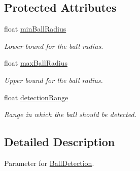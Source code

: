 \subsection*{\-Protected \-Attributes}
\begin{DoxyCompactItemize}
\item 
\hypertarget{classBallDetectionParameter_a258498986da34f843c173ad9bb2404da}{float \hyperlink{classBallDetectionParameter_a258498986da34f843c173ad9bb2404da}{min\-Ball\-Radius}}\label{classBallDetectionParameter_a258498986da34f843c173ad9bb2404da}

\begin{DoxyCompactList}\small\item\em \-Lower bound for the ball radius. \end{DoxyCompactList}\item 
\hypertarget{classBallDetectionParameter_a8ff493cc4b2a016ca7cd70f751d2aeb1}{float \hyperlink{classBallDetectionParameter_a8ff493cc4b2a016ca7cd70f751d2aeb1}{max\-Ball\-Radius}}\label{classBallDetectionParameter_a8ff493cc4b2a016ca7cd70f751d2aeb1}

\begin{DoxyCompactList}\small\item\em \-Upper bound for the ball radius. \end{DoxyCompactList}\item 
\hypertarget{classBallDetectionParameter_aca08f6d290a7fcda5359f126cf2e3065}{float \hyperlink{classBallDetectionParameter_aca08f6d290a7fcda5359f126cf2e3065}{detection\-Range}}\label{classBallDetectionParameter_aca08f6d290a7fcda5359f126cf2e3065}

\begin{DoxyCompactList}\small\item\em \-Range in which the ball should be detected. \end{DoxyCompactList}\end{DoxyCompactItemize}


\subsection{\-Detailed \-Description}
\-Parameter for \hyperlink{classBallDetection}{\-Ball\-Detection}. 

